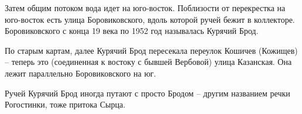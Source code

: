 Затем общим потоком вода идет на юго-вос\-ток. Поблизости от перекрестка на юго-восток есть улица Боровиковского, вдоль которой ручей бежит в коллекторе. Боровиковского с конца 19 века по 1952 год называлась Курячий Брод.

По старым картам, далее Курячий Брод пересекала переулок Кошичев (Кожищев) – теперь это (соединенная к востоку с бывшей Вербовой) улица Казанская. Она лежит параллельно Боровиковского на юг.

Ручей Курячий Брод иногда путают с просто Бродом – другим названием речки Рогостинки, тоже притока Сырца. 
